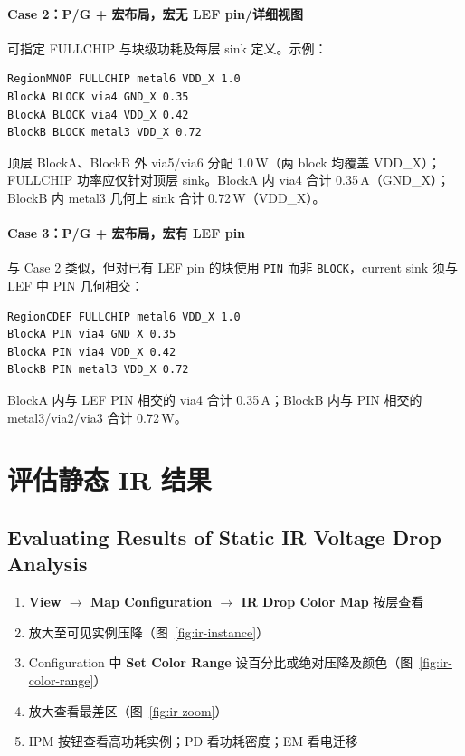 \paragraph{Case 2：P/G + 宏布局，宏无 LEF pin/详细视图}
可指定 FULLCHIP 与块级功耗及每层 sink 定义。示例：
\begin{lstlisting}
RegionMNOP FULLCHIP metal6 VDD_X 1.0
BlockA BLOCK via4 GND_X 0.35
BlockA BLOCK via4 VDD_X 0.42
BlockB BLOCK metal3 VDD_X 0.72
\end{lstlisting}
顶层 BlockA、BlockB 外 via5/via6 分配 1.0\,W（两 block 均覆盖 VDD\_X）；FULLCHIP 功率应仅针对顶层 sink。BlockA 内 via4 合计 0.35\,A（GND\_X）；BlockB 内 metal3 几何上 sink 合计 0.72\,W（VDD\_X）。

\paragraph{Case 3：P/G + 宏布局，宏有 LEF pin}
与 Case 2 类似，但对已有 LEF pin 的块使用 \texttt{PIN} 而非 \texttt{BLOCK}，current sink 须与 LEF 中 PIN 几何相交：
\begin{lstlisting}
RegionCDEF FULLCHIP metal6 VDD_X 1.0
BlockA PIN via4 GND_X 0.35
BlockA PIN via4 VDD_X 0.42
BlockB PIN metal3 VDD_X 0.72
\end{lstlisting}
BlockA 内与 LEF PIN 相交的 via4 合计 0.35\,A；BlockB 内与 PIN 相交的 metal3/via2/via3 合计 0.72\,W。

\section{评估静态 IR 结果}
\subsection*{Evaluating Results of Static IR Voltage Drop Analysis}

\begin{enumerate}
  \item \textbf{View $\rightarrow$ Map Configuration $\rightarrow$ IR Drop Color Map} 按层查看
  \item 放大至可见实例压降（图~\ref{fig:ir-instance}）
  \item Configuration 中 \textbf{Set Color Range} 设百分比或绝对压降及颜色（图~\ref{fig:ir-color-range}）
  \item 放大查看最差区（图~\ref{fig:ir-zoom}）
  \item IPM 按钮查看高功耗实例；PD 看功耗密度；EM 看电迁移
\end{enumerate}

